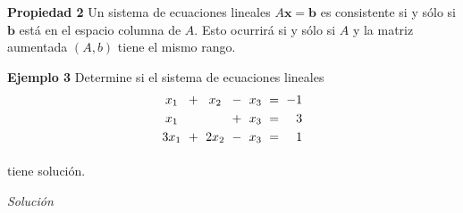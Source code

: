 \begin{frame}%

\begin{prop}{\textbf{Propiedad 2}}
	\justifying
	Un sistema de ecuaciones lineales $A\mathbf{x}=\mathbf{b}$ es consistente si y sólo si $\mathbf{b}$ está en el espacio columna de $A$.
	Esto ocurrirá si y sólo si $A$ y la matriz aumentada $(A,b)$ tiene el mismo rango.
\end{prop}	

\vspace{-1mm}

\begin{ej}{\textbf{Ejemplo 3}}
	Determine si el sistema de ecuaciones lineales
	\[
		\begin{array}{@{\hspace{0.1\tabcolsep}}c@{\hspace{\tabcolsep}}c@{\hspace{\tabcolsep}}c@{\hspace{\tabcolsep}}c@{\hspace{\tabcolsep}}c@{\hspace{\tabcolsep}}c@{\hspace{\tabcolsep}}r@{\hspace{0.1\tabcolsep}}}
		x_1 &  + & x_2  & - & x_3 & = & -1 \\[1mm]
		x_1 &    &      & + & x_3 & = & 3 \\[1mm]
		3x_1 & + & 2x_2 & - & x_3 & = & 1 \\[1mm]
		\end{array}
	\]
	
	\vspace{-2mm}
	tiene solución.
\end{ej}
\textit{Solución}

\end{frame}


\subsection{}

